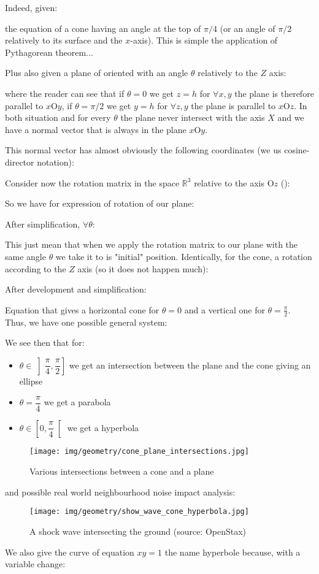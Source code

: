 \begin{enumerate}
		Indeed, given:		 
				
		the equation of a cone having an angle at the top of $\pi/4$ (or an angle of $\pi/2$ relatively to its surface and the $x$-axis). This is simple the application of Pythagorean theorem...
		
		Plus also given a plane of oriented with an angle $\theta$ relatively to the $Z$ axis:
		
		where the reader can see that if $\theta=0$ we get $z=h$ for $\forall x,y$ the plane is therefore parallel to $x\text{O}y$, if $\theta=\pi/2$ we get $y=h$ for $\forall z,y$ the plane is parallel to $x\text{O}z$. In both situation and for every $\theta$ the plane never intersect with the axis $X$ and we have a normal vector that is always in the plane $x\text{O}y$.
		
		This normal vector has almost obviously the following coordinates (we us cosine-director notation):
		
		Consider now the rotation matrix in the space $\mathbb{R}^3$ relative to the axis $\text{O}z$ ():
		
		So we have for expression of rotation of our plane:
		
		After simplification, $\forall \theta$:
		
		This just mean that when we apply the rotation matrix to our plane with the same angle $\theta$ we take it to is "initial" position.
		Identically, for the cone, a rotation according to the $Z$ axis (so it does not happen much):
		
		After development and simplification:
		
		Equation that gives a horizontal cone for $\theta=0$ and a vertical one for $\theta=\frac{\pi}{2}$.
		Thus, we have one possible general system:
		
		We see then that for:
		\begin{itemize}
			\item $\theta \in \left]\dfrac{\pi}{4},\dfrac{\pi}{2}\right]$ we get an intersection between the plane and the cone giving an ellipse
			\item $\theta=\dfrac{\pi}{4}$ we get a parabola
			\item $\theta \in \left[0,\dfrac{\pi}{4}\right[$ we get a hyperbola
		\end{itemize}
		\begin{figure}[H]
			\centering
			\texttt{[image: img/geometry/cone\_plane\_intersections.jpg]}
			\caption{Various intersections between a cone and a plane}
		\end{figure}
		and possible real world neighbourhood noise impact analysis:
		\begin{figure}[H]
			\centering
			\texttt{[image: img/geometry/show\_wave\_cone\_hyperbola.jpg]}
			\caption[A shock wave intersecting the ground]{A shock wave intersecting the ground (source: OpenStax)}
		\end{figure}
		\begin{tcolorbox}[title=Remark,colframe=black,arc=10pt]
		We also give the curve of equation $xy=1$ the name hyperbole because, with a variable change:
		

\end{tcolorbox}
\end{enumerate}
